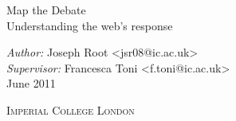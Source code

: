\begin{titlepage}

\thispagestyle{empty}

\begin{center}

\vspace*{\fill}


\minionfont{}\Huge Map the Debate \\[0.3cm]

\caslonfont{}\normalsize Understanding the web's response \\[1cm]
% 

\caslonfont

\emph{Author:} Joseph Root <jsr08@ic.ac.uk>\\
\emph{Supervisor:} Francesca Toni <f.toni@ic.ac.uk>\\ [1cm]
June 2011 \\[3cm]


% 
% 

\vspace*{\fill}

\scshape Imperial College London

\end{center}

\end{titlepage}
